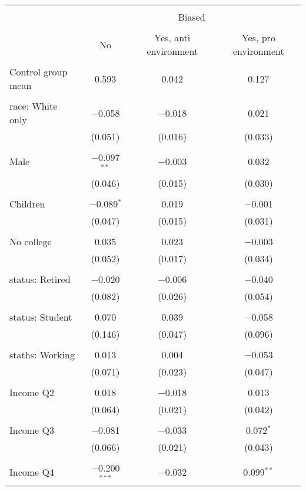 
\begin{tabular}{@{\extracolsep{5pt}}lccc} 
\\[-1.8ex]\hline 
\hline \\[-1.8ex] 
 & \multicolumn{3}{c}{Biased} \\ 
\cline{2-4} 
\\[-1.8ex] & No & Yes, anti environment & Yes, pro environment \\ 
\hline \\[-1.8ex] 
 Control group mean & 0.593 & 0.042 & 0.127  \\ \hline \\[-1.8ex] race: White only & $-$0.058 & $-$0.018 & 0.021 \\ 
  & (0.051) & (0.016) & (0.033) \\ 
  & & & \\ 
 Male & $-$0.097$^{**}$ & $-$0.003 & 0.032 \\ 
  & (0.046) & (0.015) & (0.030) \\ 
  & & & \\ 
 Children & $-$0.089$^{*}$ & 0.019 & $-$0.001 \\ 
  & (0.047) & (0.015) & (0.031) \\ 
  & & & \\ 
 No college & 0.035 & 0.023 & $-$0.003 \\ 
  & (0.052) & (0.017) & (0.034) \\ 
  & & & \\ 
 status: Retired & $-$0.020 & $-$0.006 & $-$0.040 \\ 
  & (0.082) & (0.026) & (0.054) \\ 
  & & & \\ 
 status: Student & 0.070 & 0.039 & $-$0.058 \\ 
  & (0.146) & (0.047) & (0.096) \\ 
  & & & \\ 
 staths: Working & 0.013 & 0.004 & $-$0.053 \\ 
  & (0.071) & (0.023) & (0.047) \\ 
  & & & \\ 
 Income Q2 & 0.018 & $-$0.018 & 0.013 \\ 
  & (0.064) & (0.021) & (0.042) \\ 
  & & & \\ 
 Income Q3 & $-$0.081 & $-$0.033 & 0.072$^{*}$ \\ 
  & (0.066) & (0.021) & (0.043) \\ 
  & & & \\ 
 Income Q4 & $-$0.200$^{***}$ & $-$0.032 & 0.099$^{**}$ \\ 

\end{tabular}
